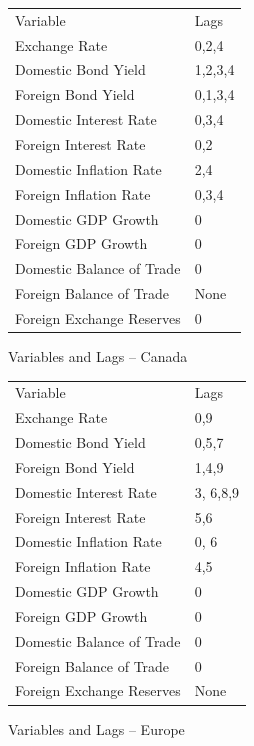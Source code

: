 \documentclass{sig-alternate-05-2015}
\begin{document}
\clearpage


\begin{figure}
\centering
\caption{Variables and Lags -- Canada}
\begin{tabular}{l l}
Variable 					& Lags  \\
Exchange Rate 				& 0,2,4		\\
Domestic Bond Yield			& 1,2,3,4		\\
Foreign Bond Yield			& 0,1,3,4		\\
Domestic Interest Rate		& 0,3,4		\\
Foreign Interest Rate		& 0,2		\\
Domestic Inflation Rate		& 2,4		\\
Foreign Inflation Rate		& 0,3,4		\\
Domestic GDP Growth			& 0		\\
Foreign GDP Growth			& 0		\\
Domestic Balance of Trade	& 0		\\
Foreign Balance of Trade		& None		\\
Foreign Exchange Reserves	& 0		\\
\end{tabular}
\label{tab:canada_vars}
\end{figure}

\begin{figure}
\centering
\caption{Variables and Lags -- Europe}
\begin{tabular}{l l}
Variable 					& Lags  \\
Exchange Rate 				& 0,9		\\
Domestic Bond Yield			& 0,5,7		\\
Foreign Bond Yield			& 1,4,9		\\
Domestic Interest Rate		& 3,	6,8,9	\\
Foreign Interest Rate		& 5,6		\\
Domestic Inflation Rate		& 0,	6		\\
Foreign Inflation Rate		& 4,5		\\
Domestic GDP Growth			& 0	\\
Foreign GDP Growth			& 0		\\
Domestic Balance of Trade	& 0	\\
Foreign Balance of Trade		& 0	\\
Foreign Exchange Reserves	& None		\\
\end{tabular}
\label{tab:europe_vars}
\end{figure}
\end{document}
